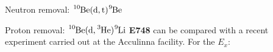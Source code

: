 \documentclass[sans,
frameno, %
mp,
usenames,dvipsnames, %
onlytextwidth, %
t,%
11pt]{beamer}
\newcommand{\iso}[2]{\ce{^{#1}#2}}
\begin{document}
\begin{frame}{Neutron removal: $\iso{10}{Be}(\textrm{d}, \textrm{t})\iso{9}{Be}$}
{        %
    }
\end{frame}

\begin{frame}{Proton removal: $\iso{10}{Be}(\textrm{d}, \iso{3}{He})\iso{9}{Li}$}
    \textbf{E748} can be compared with a recent experiment carried out at the Acculinna facility. For the $E_{x}$:


\end{frame}
\end{document}
